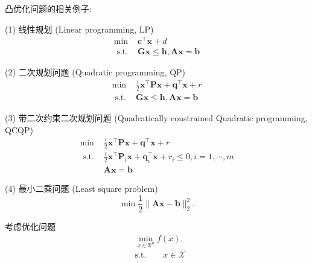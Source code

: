 \begin{example}凸优化问题的相关例子:
\par    (1) 线性规划 (Linear programming, LP)\cite{1963Linear}
    \begin{equation}
    \begin{array}{ll}
    \min & \bm{c}^{\top} \bm{x}+d \\
    \text { s.t. } & \bm{G} \bm{x} \leq \bm{h}, \bm{A} \bm{x}=\bm{b}
    \end{array}
        \nonumber
    \end{equation}
\par    (2) 二次规划问题 (Quadratic programming, QP)\cite{1995Sequential}
    \begin{equation}
    \begin{array}{ll}
    \min & \frac{1}{2} \bm{x}^{\top} \bm{P} \bm{x}+\bm{q}^{\top} \bm{x}+r \\
    \text { s.t. } & \bm{G} \bm{x} \leq \bm{h}, \bm{A} \bm{x}=\bm{b}
    \end{array}
        \nonumber
    \end{equation}
\par    (3) 带二次约束二次规划问题 (Quadratically constrained Quadratic programming, QCQP)\cite{1982Quadratically}
    \begin{equation}
    \begin{array}{ll}
    \min & \frac{1}{2} \bm{x}^{\top} \bm{P} \bm{x}+\bm{q}^{\top} \bm{x}+r \\
    \text { s.t. } & \frac{1}{2} \bm{x}^{\top} \bm{P}_{i} \bm{x}+\bm{q}_{i}^{\top} \bm{x}+r_{i} \leq 0, i=1, \cdots, m \\
    & \bm{A} \bm{x}=\bm{b}
    \end{array}
        \nonumber
    \end{equation}
\par (4) 最小二乘问题 (Least square problem)\cite{1989Least}
    \begin{equation}
    \min \frac{1}{2}\|\bm{A} \bm{x}-\bm{b}\|_{2}^{2} .
        \nonumber
    \end{equation}
\end{example}

考虑优化问题
\begin{equation}
    \begin{split}
        &\mathop{\mathrm{min}}\limits_{x\in \mathbb{R}^{n}} f(x), \\
        &\mathrm{s. t.} \quad\quad x\in \mathcal{X}
    \end{split}
\end{equation}

